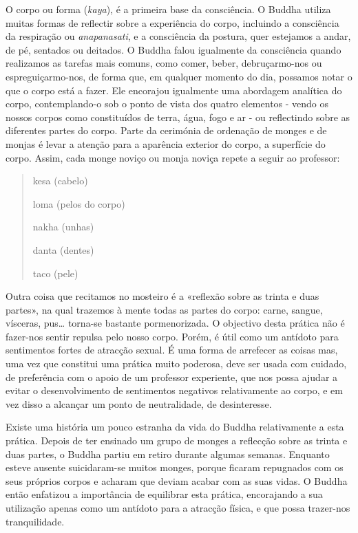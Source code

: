O corpo ou forma (\emph{kaya}), é a primeira base da consciência. O
Buddha utiliza muitas formas de reflectir sobre a experiência do corpo,
incluindo a consciência da respiração ou \emph{anapanasati}, e a
consciência da postura, quer estejamos a andar, de pé, sentados ou
deitados. O Buddha falou igualmente da consciência quando realizamos as
tarefas mais comuns, como comer, beber, debruçarmo-nos ou
espreguiçarmo-nos, de forma que, em qualquer momento do dia, possamos
notar o que o corpo está a fazer. Ele encorajou igualmente uma abordagem
analítica do corpo, contemplando-o sob o ponto de vista dos quatro
elementos - vendo os nossos corpos como constituídos de terra, água,
fogo e ar - ou reflectindo sobre as diferentes partes do corpo. Parte da
cerimónia de ordenação de monges e de monjas é levar a atenção para a
aparência exterior do corpo, a superfície do corpo. Assim, cada monge
noviço ou monja noviça repete a seguir ao professor:

\begin{quote}
  kesa (cabelo)

  loma (pelos do corpo)

  nakha (unhas)

  danta (dentes)

  taco (pele)
\end{quote}

Outra coisa que recitamos no mosteiro é a «reflexão sobre as trinta e
duas partes», na qual trazemos à mente todas as partes do corpo: carne,
sangue, vísceras, pus\ldots{} torna-se bastante pormenorizada. O
objectivo desta prática não é fazer-nos sentir repulsa pelo nosso corpo.
Porém, é útil como um antídoto para sentimentos fortes de atracção
sexual. É uma forma de arrefecer as coisas mas, uma vez que constitui
uma prática muito poderosa, deve ser usada com cuidado, de preferência
com o apoio de um professor experiente, que nos possa ajudar a evitar o
desenvolvimento de sentimentos negativos relativamente ao corpo, e em
vez disso a alcançar um ponto de neutralidade, de desinteresse.

Existe uma história um pouco estranha da vida do Buddha relativamente a
esta prática. Depois de ter ensinado um grupo de monges a reflecção
sobre as trinta e duas partes, o Buddha partiu em retiro durante algumas
semanas. Enquanto esteve ausente suicidaram-se muitos monges, porque
ficaram repugnados com os seus próprios corpos e acharam que deviam
acabar com as suas vidas. O Buddha então enfatizou a importância de
equilibrar esta prática, encorajando a sua utilização apenas como um
antídoto para a atracção física, e que possa trazer-nos tranquilidade.

